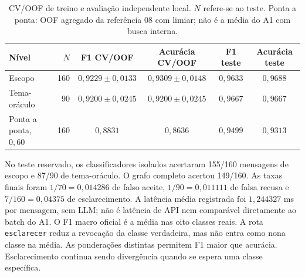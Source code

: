 \newcommand{\ConclusaoTeste}{No teste humano local, houve 149 acertos em 160 mensagens, F1 macro de \(0{,}9499\) e sete esclarecimentos.}
\begin{table}[!htb]\centering\small
\caption{CV/OOF de treino e avaliação independente local. \(N\) refere-se ao teste. Ponta a ponta: OOF agregado da referência 08 com limiar; não é a média do A1 com busca interna.}
\label{tab:independente}
\begin{tabular}{lrcccc}\toprule
Nível & \(N\) & F1 CV/OOF & Acurácia CV/OOF & F1 teste & Acurácia teste\\ \midrule
Escopo & 160 & \(0{,}9229\pm0{,}0133\) & \(0{,}9309\pm0{,}0148\) & \(0{,}9633\) & \(0{,}9688\)\\
Tema-oráculo & 90 & \(0{,}9200\pm0{,}0245\) & \(0{,}9200\pm0{,}0245\) & \(0{,}9667\) & \(0{,}9667\)\\
Ponta a ponta, \(0{,}60\) & 160 & \(0{,}8831\) & \(0{,}8636\) & \(0{,}9499\) & \(0{,}9313\)\\
\bottomrule\end{tabular}\end{table}
No teste reservado, os classificadores isolados acertaram 155/160 mensagens de escopo e 87/90 de tema-oráculo. O grafo completo acertou 149/160. As taxas finais foram \(1/70=0{,}014286\) de falso aceite, \(1/90=0{,}011111\) de falsa recusa e \(7/160=0{,}04375\) de esclarecimento. A latência média registrada foi \(1{,}244327\) ms por mensagem, sem LLM; não é latência de API nem comparável diretamente ao batch do A1.
O F1 macro oficial é a média nas oito classes reais. A rota \texttt{esclarecer} reduz a revocação da classe verdadeira, mas não entra como nona classe na média. As ponderações distintas permitem F1 maior que acurácia. Esclarecimento continua sendo divergência quando se espera uma classe específica.
